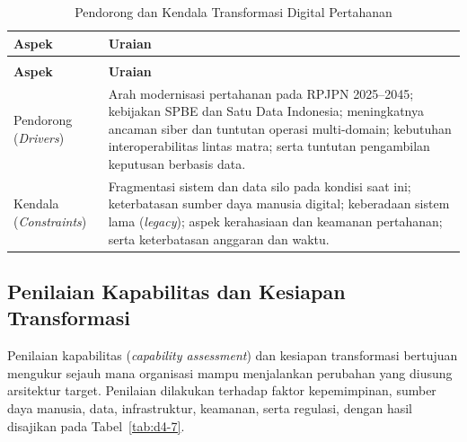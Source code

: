 \begin{longtable}{@{}>{\raggedright\arraybackslash}p{}>{\raggedright\arraybackslash}p{}@{}}
\caption{Pendorong dan Kendala Transformasi Digital Pertahanan}
\label{tab:d4-6}\\
\toprule
\textbf{Aspek} & \textbf{Uraian}\\
\midrule
\endfirsthead
\multicolumn{2}{@{}l}{\small\itshape \tablename\ \thetable{} (lanjutan)}\\
\toprule
\textbf{Aspek} & \textbf{Uraian}\\
\midrule
\endhead
\bottomrule
\endlastfoot
Pendorong (\textit{Drivers}) & Arah modernisasi pertahanan pada RPJPN 2025–2045; kebijakan SPBE dan Satu Data Indonesia; meningkatnya ancaman siber dan tuntutan operasi multi-domain; kebutuhan interoperabilitas lintas matra; serta tuntutan pengambilan keputusan berbasis data.\\
Kendala (\textit{Constraints}) & Fragmentasi sistem dan data silo pada kondisi saat ini; keterbatasan sumber daya manusia digital; keberadaan sistem lama (\textit{legacy}); aspek kerahasiaan dan keamanan pertahanan; serta keterbatasan anggaran dan waktu.\\
\end{longtable}

\subsection{Penilaian Kapabilitas dan Kesiapan Transformasi}

Penilaian kapabilitas (\textit{capability assessment}) dan kesiapan transformasi bertujuan mengukur sejauh mana organisasi mampu menjalankan perubahan yang diusung arsitektur target. Penilaian dilakukan terhadap faktor kepemimpinan, sumber daya manusia, data, infrastruktur, keamanan, serta regulasi, dengan hasil disajikan pada Tabel~\ref{tab:d4-7}.

